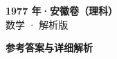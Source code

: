 \documentclass[zihao=-4, a4paper]{ctexart}
\begin{document}
\begin{center}
  {\Large\bfseries 1977 年·安徽卷（理科）}\\[4pt]
  {\large 数学 · 解析版}
\end{center}
\medskip
{}

\clearpage
{}
\begin{center}{\Large\bfseries 参考答案与详细解析}\end{center}
\medskip

\end{document}
